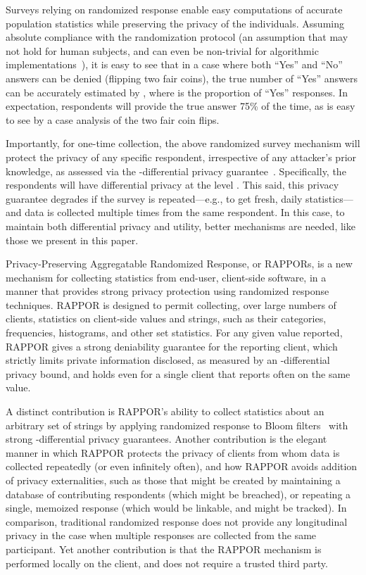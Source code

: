 \documentclass{sig-alternate-2013}
\newcommand\RAPPOR{{RAPPOR}}
\begin{document}
Surveys relying on randomized response enable easy computations of accurate population statistics while preserving the privacy of the individuals. Assuming absolute compliance with the randomization protocol (an assumption that may not hold for human subjects, and can even be non-trivial for algorithmic implementations~\cite{mironov-CCS12}), it is easy to see that in a case where both ``Yes'' and ``No'' answers can be denied (flipping two fair coins), the true number of ``Yes'' answers can be accurately estimated by , where  is the proportion of ``Yes'' responses. 
In expectation,
respondents will provide the true answer 75\% of the time,
as is easy to see by
a case analysis of the two fair coin flips.

Importantly,
for one-time collection,
the above randomized survey mechanism
will protect the privacy
of any specific respondent,
irrespective of any attacker's prior knowledge, 
as assessed via the -differential privacy guarantee~\cite{dwork06}.
Specifically,
the respondents will have
differential privacy at the level .
This said,
this privacy guarantee degrades
if the survey is repeated---e.g.,
to get fresh, daily statistics---and
data is collected multiple times from the same respondent.
In this case,
to maintain both differential privacy and utility,
better mechanisms are needed,
like those we present in this paper.


Privacy-Preserving Aggregatable Randomized Response, 
or \RAPPOR{}s, is a new mechanism for collecting statistics from end-user, client-side software, 
in a manner that provides strong privacy protection
using randomized response techniques.  
\RAPPOR{} is designed to permit collecting, over large numbers of clients, 
statistics on client-side values and strings, 
such as their categories, frequencies, histograms, 
and other set statistics.
For any given value reported,
\RAPPOR{}
gives 
a strong deniability guarantee for the reporting client,
which strictly limits private information disclosed,
as measured by an -differential privacy bound,
and holds even for 
a single client that reports often on the same value.

A distinct contribution is \RAPPOR{}'s ability 
to collect statistics about an arbitrary set of strings 
by applying randomized response to Bloom filters~\cite{bloom} 
with strong -differential privacy guarantees. 
Another contribution is the elegant manner
in which \RAPPOR{}
protects the privacy of clients 
from whom data is collected repeatedly (or even infinitely often), and
how \RAPPOR{}
avoids addition of privacy externalities,
such as those that might be created by
maintaining a database of contributing respondents (which might be breached),
or repeating a single, memoized response (which would be linkable, and might be tracked).
In comparison,
traditional randomized response does not provide any longitudinal privacy 
in the case when multiple responses are collected from the same participant. 
Yet another contribution is that the \RAPPOR{}  mechanism is performed locally on the client, and does not require a trusted third party.
\end{document}
